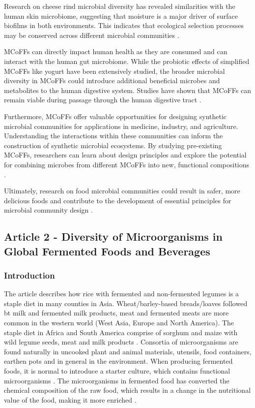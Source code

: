 Research on cheese rind microbial diversity has revealed similarities with the human skin microbiome, suggesting that moisture is a major driver of surface biofilms in both environments. This indicates that ecological selection processes may be conserved across different microbial communities \cite*{L1-FermentedFoods}.

MCoFFs can directly impact human health as they are consumed and can interact with the human gut microbiome. While the probiotic effects of simplified MCoFFs like yogurt have been extensively studied, the broader microbial diversity in MCoFFs could introduce additional beneficial microbes and metabolites to the human digestive system. Studies have shown that MCoFFs can remain viable during passage through the human digestive tract \cite*{L1-FermentedFoods}.

Furthermore, MCoFFs offer valuable opportunities for designing synthetic microbial communities for applications in medicine, industry, and agriculture. Understanding the interactions within these communities can inform the construction of synthetic microbial ecosystems. By studying pre-existing MCoFFs, researchers can learn about design principles and explore the potential for combining microbes from different MCoFFs into new, functional compositions \cite*{L1-FermentedFoods}. 

Ultimately, research on food microbial communities could result in safer, more delicious foods and contribute to the development of essential principles for microbial community design \cite*{L1-FermentedFoods}.

\subsection{Article 2 - Diversity of Microorganisms in Global Fermented Foods and Beverages}    

\subsubsection*{Introduction}
The article describes how rice with fermented and non-fermented legumes is a staple diet in many counties in Asia. Wheat/barley-based breads/loaves followed bt milk and fermented milk products, meat and fermented meats are more common in the western world (West Asia, Europe and North America). The staple diet in Africa and South America comprise of sorghum and maize with wild legume seeds, meat and milk products \cite*{L1-DiversityMicro}. 
Consortia of microorganisms are found naturally in uncooked plant and animal materials, utensils, food containers, earthen pots and in general in the environment. When producing fermented foods, it is normal to introduce a starter culture, which contains functional microorganisms \cite*{L1-DiversityMicro}. The microorganisms in fermented food has converted the chemical composition of the raw food, which results in a change in the nutritional value of the food, making it more enriched \cite*{L1-DiversityMicro}.

